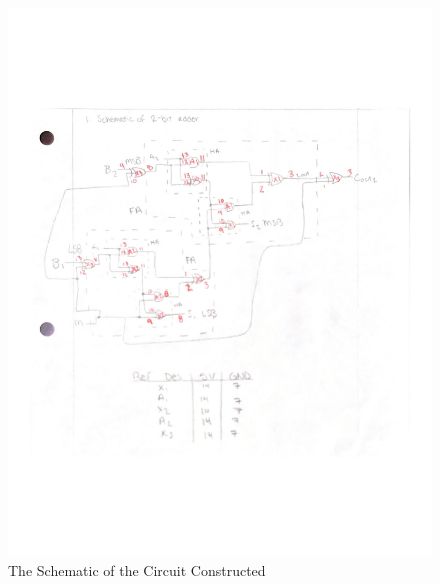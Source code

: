 \documentclass[11pt]{article}
\begin{document}
\begin{figure}
	\includegraphics[width=1.0\textwidth]{"Schematic"}
	\caption{The Schematic of the Circuit Constructed}
\end{figure}
\clearpage
\end{document}

